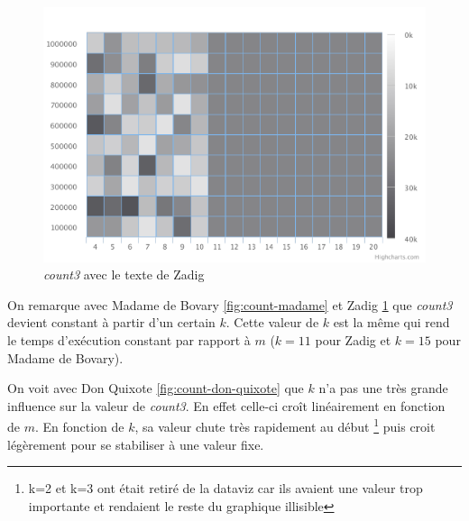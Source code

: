 \documentclass[10pt, a4paper]{article}
\begin{document}
\begin{figure}[ht]
    \centering
    \includegraphics[width=1.0\textwidth]{count-zadig}
    \caption{\emph{count3} avec le texte de Zadig}
    \label{fig:count-zadig}
\end{figure}

On remarque avec Madame de Bovary \ref{fig:count-madame} et Zadig
\ref{fig:count-zadig} que \emph{count3} devient constant à partir d'un certain
$k$. Cette valeur de $k$ est la même qui rend le temps d'exécution constant par
rapport à $m$ ($k=11$ pour Zadig et $k=15$ pour Madame de Bovary).

On voit avec Don Quixote \ref{fig:count-don-quixote} que $k$ n'a pas une très
grande influence sur la valeur de \emph{count3}. En effet celle-ci croît
linéairement en fonction de $m$. En fonction de $k$, sa valeur chute très
rapidement au début \footnote{k=2 et k=3 ont était retiré de la dataviz car ils
avaient une valeur trop importante et rendaient le reste du graphique
illisible} puis croit légèrement pour se stabiliser à une valeur fixe. \\
\end{document}
